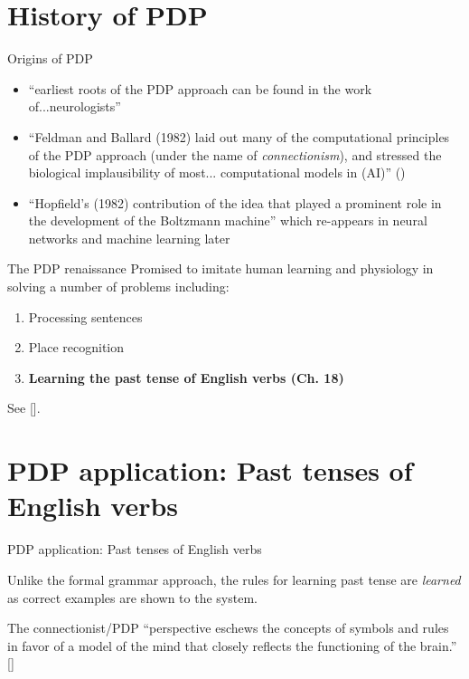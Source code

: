 \documentclass{beamer}
\begin{document}
\section{History of PDP}
\begin{frame}{Origins of PDP}

    \begin{itemize}
        \item ``earliest roots of the PDP approach can be found
            in the work of...neurologists''
        \item ``Feldman and Ballard (1982) laid out many of the computational principles of the PDP approach (under the name of \textit{connectionism}), and stressed the  biological implausibility of most... computational models in (AI)'' ()
        \item ``Hopfield's (1982) contribution of the idea that played a prominent role in the development of the Boltzmann machine'' which re-appears in neural
            networks and machine learning later
    \end{itemize}
\end{frame}

\begin{frame}{The PDP renaissance}
    Promised to imitate human learning and physiology in solving a number of
    problems including:
    \begin{enumerate}
        \item Processing sentences
        \item Place recognition
        \item \textbf{Learning the past tense of English verbs (Ch. 18)}
    \end{enumerate}
    \vspace{20pt}

    See [].
\end{frame}

\section{PDP application: Past tenses of English verbs}
\begin{frame}{PDP application: Past tenses of English verbs}

    Unlike the formal grammar approach, the rules for learning past tense
    are \textit{learned} as correct examples are shown to the system.

    \vspace{10px}

    The connectionist/PDP
    ``perspective eschews the concepts of symbols and rules in favor of
    a model of the mind that closely reflects the functioning of the brain.''
    []
\end{frame}
\end{document}
